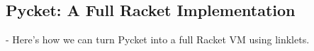 \subsection{Pycket: A Full Racket Implementation}
\label{subsec:pycket}

- Here's how we can turn Pycket into a full Racket VM using linklets.
